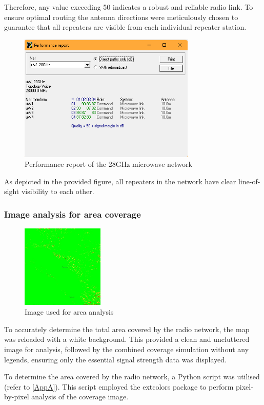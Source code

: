 Therefore, any value exceeding 50 indicates a robust and reliable radio link.
To ensure optimal routing the antenna directions were meticulously chosen to guarantee that all repeaters are visible from each individual repeater station.
\begin{figure}[h]
    \centering
    \includegraphics[width=0.75\textwidth]{Images/Performance Report.png}
    \caption{Performance report of the 28GHz microwave network}
    \label{fig:Perfrep}
\end{figure}

As depicted in the provided figure, all repeaters in the network have clear line-of-sight visibility to each other.


\subsubsection{Image analysis for area coverage}

\begin{figure}
    \vspace{-5mm}
    \centering
    \includegraphics[width=0.35\textwidth]{Images/Combined.jpg}
    \caption{\small Image used for area analysis}
    \label{fig:ImgAna}
\end{figure}
To accurately determine the total area covered by the radio network, the map was reloaded with a white background.
This provided a clean and uncluttered image for analysis, followed by the combined coverage simulation without any legends, ensuring only the essential signal strength data was displayed.

To determine the area covered by the radio network, a Python script was utilised (refer to \ref{AppA}).
This script employed the {\selectfont extcolors} package to perform pixel-by-pixel analysis of the coverage image.
\par
